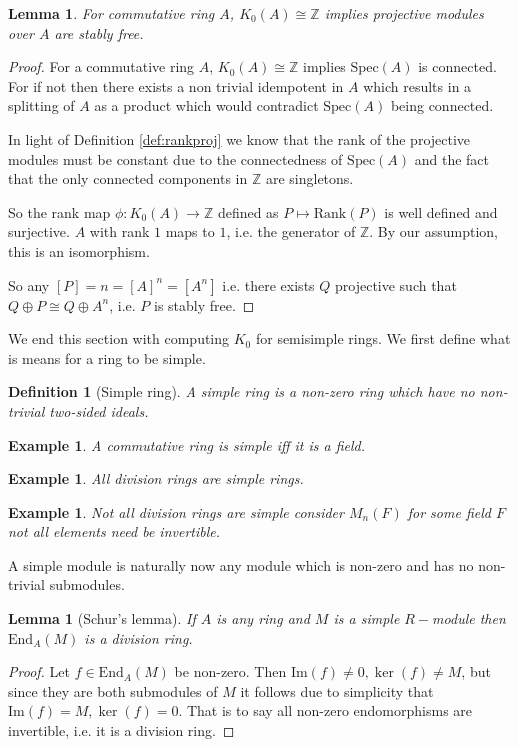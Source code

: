 \documentclass[12pt]{report}
\numberwithin{equation}{section}
\newcommand{\Z}{\mathbb{Z}}
\newcommand{\image}{{\mathrm{Im}}}
\newcounter{dummy} \numberwithin{dummy}{section}
\newtheorem{definition}[dummy]{Definition}
\newtheorem{lemma}[dummy]{Lemma}
\newtheorem{example}[dummy]{Example}
\begin{document}
	\begin{lemma} For commutative ring $A$, 
		$K_0(A) \cong \Z $ implies projective modules over $A$ are stably free.
	\end{lemma}
	\begin{proof}
		For a commutative ring $A$, $K_0(A) \cong \Z $ implies $ \mathrm{Spec}(A)$ is connected. For if not then there exists a non trivial idempotent in $A$ which results in a splitting of $A$ as a product which would contradict $\mathrm{Spec}(A)$ being connected.
		
		In light of Definition \ref{def:rankproj} we know that the rank of the projective modules must be constant due to the connectedness of $\mathrm{Spec}(A)$ and the fact that the only connected components in $\Z $ are singletons. 
		
		So the rank map $\phi:K_0(A) \to \Z $ defined as $P \mapsto \mathrm{Rank}(P)$ is well defined and surjective. $A$ with rank $1$ maps to $1$, i.e. the generator of $\Z$. By our assumption, this is an isomorphism.				
		
		So any $[P]=n=[A]^n=[A^n]$ i.e. there exists $Q$ projective such that $Q\oplus P \cong Q \oplus A^n$, i.e. $P$ is stably free.
	\end{proof}
	
	We end this section with computing $K_0$ for semisimple rings. We first define what is means for a ring to be simple.
	
	\begin{definition}[Simple ring]
		A simple ring is a non-zero ring which have no non-trivial two-sided ideals.
	\end{definition}
	\begin{example}
		A commutative ring is simple iff it is a field.
	\end{example}
	\begin{example}
		All division rings are simple rings.
	\end{example}
	\begin{example}
		Not all division rings are simple consider $M_n(F)$ for some field $F$ not all elements need be invertible.
	\end{example}
	
	A simple module is naturally now any module which is non-zero and has no non-trivial submodules.
	
	\begin{lemma}[Schur's lemma]\label{schurs}
		If $A$ is any ring and $M$ is a simple $R-$module then $\mathrm{End}_A(M)$ is a division ring.
	\end{lemma}
	\begin{proof}
		Let $f \in \mathrm{End}_A(M)$ be non-zero. Then $\image (f) \neq 0, \ker (f) \neq M$, but since they are both submodules of $M$ it follows due to simplicity that $\image (f)=M, \ker (f)=0$. That is to say all non-zero endomorphisms are invertible, i.e. it is a division ring.
	\end{proof}
	
\end{document}
